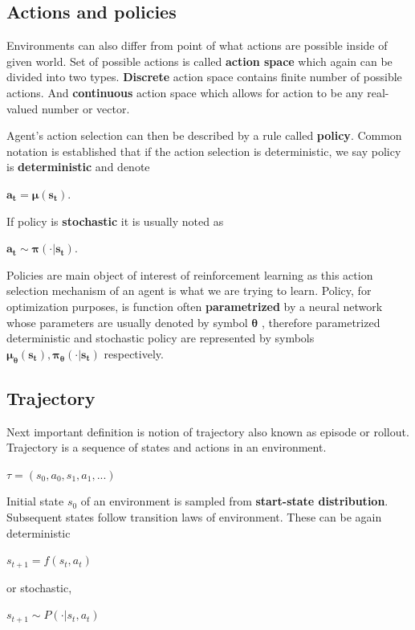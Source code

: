 \subsection*{Actions and policies}
Environments can also differ from point of what actions are possible inside of given world.
Set of possible actions is called \textbf{action space} which again can be divided into two types. 
\textbf{Discrete} action space contains finite number of possible actions. 
And \textbf{continuous} action space which allows for action to be any real-valued number or vector.

Agent's action selection can then be described by a rule called \textbf{policy}. 
Common notation is established that if the action selection is deterministic, we say policy is \textbf{deterministic} and denote 

\begin{center}
$
\bm{a_t = \mu(s_t)}
$.
\end{center}

If policy is \textbf{stochastic} it is usually noted as 

\begin{center}
    $
    \bm{a_t \sim \pi(\cdot |s_t)}
    $.
\end{center}

Policies are main object of interest of reinforcement learning as this action selection mechanism of an agent is what we are trying to learn.
Policy, for optimization purposes, is function often \textbf{parametrized} by a neural network whose parameters are usually denoted by symbol
$
    \bm{\theta}
$
, therefore parametrized deterministic and stochastic policy are represented by symbols     $\bm{\mu_\theta(s_t)} , \bm{\pi_\theta(\cdot |s_t)}$ respectively.

\subsection*{Trajectory}
Next important definition is notion of trajectory also known as episode or rollout.
Trajectory is a sequence of states and actions in an environment.
\begin{center}
    $\tau = (s_0, a_0, s_1, a_1, ...)$
\end{center}
Initial state $s_0$ of an environment is sampled from \textbf{start-state distribution}. 
Subsequent states follow transition laws of environment. 
These can be again deterministic 
\begin{center}
    $s_{t+1} = f(s_t, a_t)$
\end{center} or stochastic,
\begin{center}
    $s_{t+1} \sim P(\cdot | s_t, a_t)$
\end{center}

